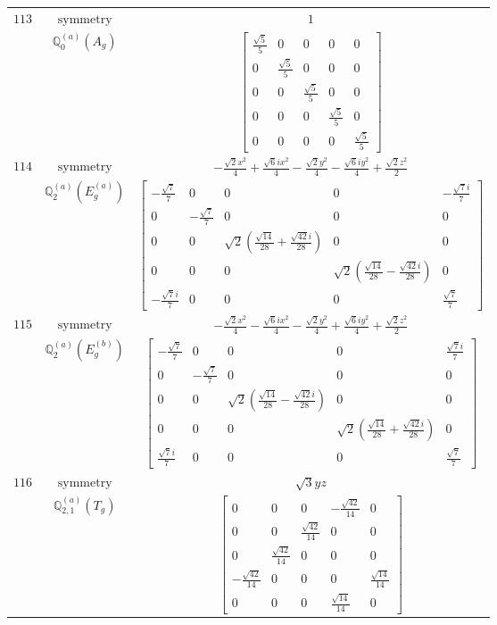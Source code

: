 \documentclass[fleqn,8pt,landscape]{jsarticle}
\begin{document}
\begin{longtable}{ccc}
$ 113 $ & $ \text{symmetry} $ & $ 1 $ \\
$  $ & $ \mathbb{Q}_{0}^{(a)}(A_{g}) $ & $ \begin{bmatrix} \frac{\sqrt{5}}{5} & 0 & 0 & 0 & 0 \\ 0 & \frac{\sqrt{5}}{5} & 0 & 0 & 0 \\ 0 & 0 & \frac{\sqrt{5}}{5} & 0 & 0 \\ 0 & 0 & 0 & \frac{\sqrt{5}}{5} & 0 \\ 0 & 0 & 0 & 0 & \frac{\sqrt{5}}{5} \end{bmatrix} $ \\ \hline
$ 114 $ & $ \text{symmetry} $ & $ - \frac{\sqrt{2} x^{2}}{4} + \frac{\sqrt{6} i x^{2}}{4} - \frac{\sqrt{2} y^{2}}{4} - \frac{\sqrt{6} i y^{2}}{4} + \frac{\sqrt{2} z^{2}}{2} $ \\
$  $ & $ \mathbb{Q}_{2}^{(a)}(E_{g}^{(a)}) $ & $ \begin{bmatrix} - \frac{\sqrt{7}}{7} & 0 & 0 & 0 & - \frac{\sqrt{7} i}{7} \\ 0 & - \frac{\sqrt{7}}{7} & 0 & 0 & 0 \\ 0 & 0 & \sqrt{2} \left(\frac{\sqrt{14}}{28} + \frac{\sqrt{42} i}{28}\right) & 0 & 0 \\ 0 & 0 & 0 & \sqrt{2} \left(\frac{\sqrt{14}}{28} - \frac{\sqrt{42} i}{28}\right) & 0 \\ - \frac{\sqrt{7} i}{7} & 0 & 0 & 0 & \frac{\sqrt{7}}{7} \end{bmatrix} $ \\ \hline
$ 115 $ & $ \text{symmetry} $ & $ - \frac{\sqrt{2} x^{2}}{4} - \frac{\sqrt{6} i x^{2}}{4} - \frac{\sqrt{2} y^{2}}{4} + \frac{\sqrt{6} i y^{2}}{4} + \frac{\sqrt{2} z^{2}}{2} $ \\
$  $ & $ \mathbb{Q}_{2}^{(a)}(E_{g}^{(b)}) $ & $ \begin{bmatrix} - \frac{\sqrt{7}}{7} & 0 & 0 & 0 & \frac{\sqrt{7} i}{7} \\ 0 & - \frac{\sqrt{7}}{7} & 0 & 0 & 0 \\ 0 & 0 & \sqrt{2} \left(\frac{\sqrt{14}}{28} - \frac{\sqrt{42} i}{28}\right) & 0 & 0 \\ 0 & 0 & 0 & \sqrt{2} \left(\frac{\sqrt{14}}{28} + \frac{\sqrt{42} i}{28}\right) & 0 \\ \frac{\sqrt{7} i}{7} & 0 & 0 & 0 & \frac{\sqrt{7}}{7} \end{bmatrix} $ \\ \hline
$ 116 $ & $ \text{symmetry} $ & $ \sqrt{3} y z $ \\
$  $ & $ \mathbb{Q}_{2,1}^{(a)}(T_{g}) $ & $ \begin{bmatrix} 0 & 0 & 0 & - \frac{\sqrt{42}}{14} & 0 \\ 0 & 0 & \frac{\sqrt{42}}{14} & 0 & 0 \\ 0 & \frac{\sqrt{42}}{14} & 0 & 0 & 0 \\ - \frac{\sqrt{42}}{14} & 0 & 0 & 0 & \frac{\sqrt{14}}{14} \\ 0 & 0 & 0 & \frac{\sqrt{14}}{14} & 0 \end{bmatrix} $ \\ \hline

\end{longtable}
\end{document}
